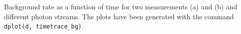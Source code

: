 \label{fig:bg_timetrace} Background rate as a function of time for two measurements (a) and (b) and different photon streams. The plots have been generated with the command \texttt{dplot(d, timetrace\_bg)}.